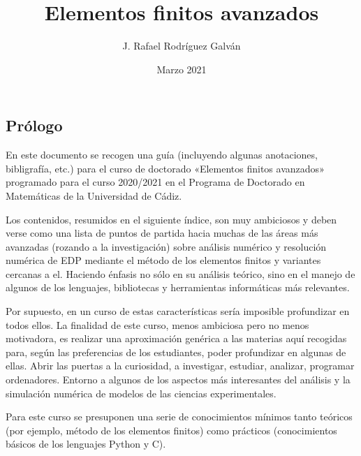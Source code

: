 \documentclass[11pt]{article}
\title{Elementos finitos avanzados}
\author{J. Rafael Rodríguez Galván}
\date{Marzo 2021}
\begin{document}
\maketitle
\tableofcontents

\subsection*{Prólogo}
En este documento se recogen una guía (incluyendo algunas anotaciones,
bibligrafía, etc.) para el curso de doctorado «Elementos finitos
avanzados» programado para el curso 2020/2021 en el Programa de
Doctorado en Matemáticas de la Universidad de Cádiz.

Los contenidos, resumidos en el siguiente índice, son muy ambiciosos y
deben verse como una lista de puntos de partida hacia muchas de las
áreas más avanzadas (rozando a la investigación) sobre análisis
numérico y resolución numérica de EDP mediante el método de los
elementos finitos y variantes cercanas a el. Haciendo énfasis no sólo
en su análisis teórico, sino en el manejo de algunos de los lenguajes,
bibliotecas y herramientas informáticas más relevantes.

Por supuesto, en un curso de estas características sería imposible
profundizar en todos ellos. La finalidad de este curso, menos
ambiciosa pero no menos motivadora, es realizar una aproximación
genérica a las materias aquí recogidas para, según las preferencias de
los estudiantes, poder profundizar en algunas de ellas.  Abrir las
puertas a la curiosidad, a investigar, estudiar, analizar, programar
ordenadores. Entorno a algunos de los aspectos más interesantes del
análisis y la simulación numérica de modelos de las ciencias experimentales.

Para este curso se presuponen una serie de conocimientos mínimos tanto
teóricos (por ejemplo, método de los elementos finitos) como prácticos
(conocimientos básicos de los lenguajes Python y C).














\appendix




\end{document}
